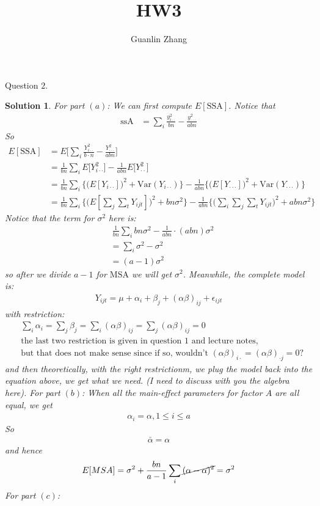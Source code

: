 \documentclass[11pt]{article}
\title{HW3}
\author{Guanlin Zhang}
\newtheorem{sol}{Solution}
\begin{document}
Question $2$.
\begin{sol}
	For part $(a)$:\vskip 2mm
	We can first compute $E[\text{SSA}]$. Notice that
	\begin{align*}
		\text{ssA} &= \sum_i \frac{y^2_{i\cdot\cdot}}{bn} - \frac{y^2_{\cdot\cdot\cdot}}{abn}
	\end{align*}
	So
	\begin{align*}
		E[\text{SSA}]  &= E\Big[\sum_i \frac{Y_{i\cdot\cdot}^2}{b\cdot n} - \frac{Y^2_{\cdot\cdot\cdot}}{abn}\Big]\\
		&= \frac{1}{bn}\sum_i E\Big[Y^2_{i\cdot\cdot}\Big] - \frac{1}{abn}E\Big[Y^2_{\cdot\cdot}\Big]\\
		&= \frac{1}{bn}\sum_i\Big\{\Big(E[Y_{i\cdot\cdot}]\Big)^2 + \text{Var}(Y_{i\cdot\cdot})\Big\} - \frac{1}{abn}\Big\{\Big(E[Y_{\cdot\cdot\cdot}]\Big)^2 + \text{Var}(Y_{\cdot\cdot\cdot})\Big\}\\
		&= \frac{1}{bn}\sum_i\Big\{\Big(E[\sum_j\sum_t Y_{ijt}]\Big)^2 + bn\sigma^2\Big\} - \frac{1}{abn}\Big\{\Big(\sum_i\sum_j\sum_t Y_{ijt}\Big)^2 + abn\sigma^2\Big\}
	\end{align*}
	Notice that the term for $\sigma^2$ here is:
	\begin{align*}
		&\ \frac{1}{bn}\sum_i bn\sigma^2 - \frac{1}{abn}\cdot (abn)\sigma^2\\
		&= \sum_i \sigma^2 - \sigma^2\\
		&= (a - 1)\sigma^2
	\end{align*}
	so after we divide $a - 1$ for $\text{MSA}$ we will get $\sigma^2$.\vskip 2mm
	 Meanwhile, the complete model is:
	\begin{align*}
		Y_{ijt} = \mu + \alpha_i + \beta_j + (\alpha\beta)_{ij} + \epsilon_{ijt}
	\end{align*}
	with restriction:
	\begin{align*}
		&\sum_i \alpha_i = \sum_j \beta_j = \sum_i(\alpha\beta)_{ij} = \sum_j(\alpha\beta)_{ij} = 0\\
		&\text{the last two restriction is given in question 1 and lecture notes,}\\
		&\text{but that does not make sense since if so, wouldn't }(\alpha\beta)_{i\cdot} = (\alpha\beta)_{\cdot j} = 0?
	\end{align*} 
	and then theoretically, with the right restrictionm, we plug the model back into the equation above, we get what we need.\vskip 2mm
	(I need to discuss with you the algebra here).\vskip 2mm
	For part $(b)$:\vskip 2mm
	When all the main-effect parameters for factor $A$ are all equal, we get
	\begin{align*}
		\alpha_i = \alpha, 1 \leq i \leq a
	\end{align*}
	So 
	\begin{align*}
		\bar{\alpha} = \alpha
	\end{align*}
	and hence
	\begin{align*}
		E[MSA] = \sigma^2 + \frac{bn}{a - 1}\sum_i \cancel{(\alpha - \alpha)^2} = \sigma^2
	\end{align*}
	For part $(c)$:\vskip 2mm
	
\end{sol}
\end{document}
